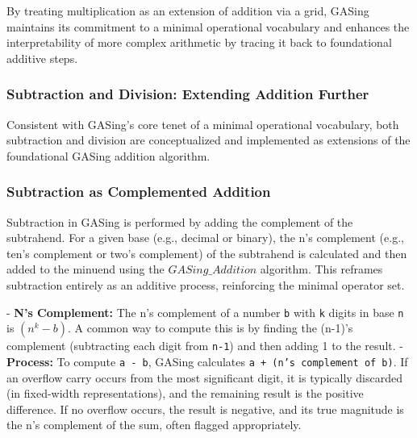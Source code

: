 By treating multiplication as an extension of addition via a grid, GASing maintains its commitment to a minimal operational vocabulary and enhances the interpretability of more complex arithmetic by tracing it back to foundational additive steps.
\subsubsection{Subtraction and Division: Extending Addition Further}

Consistent with GASing's core tenet of a minimal operational vocabulary, both subtraction and division are conceptualized and implemented as extensions of the foundational GASing addition algorithm.
\subsubsection{Subtraction as Complemented Addition}

Subtraction in GASing is performed by adding the complement of the subtrahend. For a given base (e.g., decimal or binary), the n's complement (e.g., ten's complement or two's complement) of the subtrahend is calculated and then added to the minuend using the \texttt{$GASing\_{Addition}$} algorithm. This reframes subtraction entirely as an additive process, reinforcing the minimal operator set.

- \textbf{N's Complement:} The n's complement of a number \texttt{b} with \texttt{k} digits in base \texttt{n} is \texttt{$(n^{k} - b)$}. A common way to compute this is by finding the (n-1)'s complement (subtracting each digit from \texttt{n-1}) and then adding 1 to the result.
- \textbf{Process:} To compute \texttt{a - b}, GASing calculates \texttt{a + (n's complement of b)}. If an overflow carry occurs from the most significant digit, it is typically discarded (in fixed-width representations), and the remaining result is the positive difference. If no overflow occurs, the result is negative, and its true magnitude is the n's complement of the sum, often flagged appropriately.

